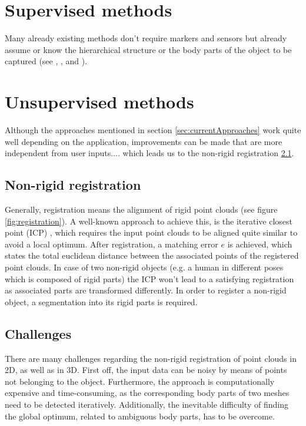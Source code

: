 \section{Supervised methods}
Many already existing methods don't require markers and sensors but already assume or know the hierarchical structure or the body parts of the object to be captured (see \cite{multiLayerSkeleton}, \cite{baker2005shape}, \cite{de2008hierarchical} and \cite{michoud2007real}).

\section{Unsupervised methods}
Although the approaches mentioned in section \ref{sec:currentApproaches} work quite well depending on the application, improvements can be made that are more independent from user inputs.... which leads us to the non-rigid registration \ref{nonrigidregistration}.

\subsection{Non-rigid registration}
\label{nonrigidregistration}

Generally, registration means the alignment of rigid point clouds (see figure \ref{fig:registration}). A well-known approach to achieve this, is the iterative closest point (ICP) \cite{ICP}, which requires the input point clouds to be aligned quite similar to avoid a local optimum. After registration, a matching error $e$ is achieved, which states the total euclidean distance between the associated points of the registered point clouds. In case of two non-rigid objects (e.g. a human in different poses which is composed of rigid parts) the ICP won't lead to a satisfying registration as associated parts are transformed differently. In order to register a non-rigid object, a segmentation into its rigid parts is required.

\subsection{Challenges}
\label{Challenges}
There are many challenges regarding the non-rigid registration of point clouds in 2D, as well as in 3D. First off, the input data can be noisy by means of points not belonging to the object. Furthermore, the approach is computationally expensive and time-consuming, as the corresponding body parts of two meshes need to be detected iteratively. Additionally, the inevitable difficulty of finding the global optimum, related to ambiguous body parts, has to be overcome.


